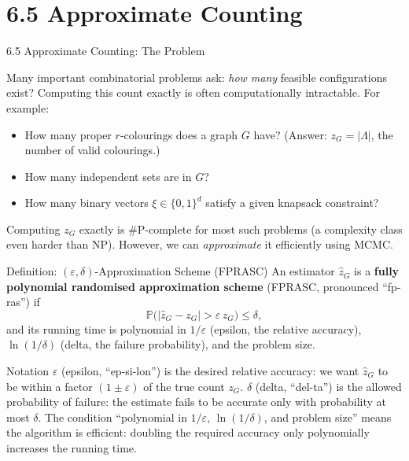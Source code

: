 \documentclass[aspectratio=169,10pt]{beamer}
\newcommand{\PP}{\mathbb{P}}
\begin{document}
\section{6.5 Approximate Counting}

\begin{frame}[allowframebreaks]{6.5 Approximate Counting: The Problem}

Many important combinatorial problems ask: \emph{how many} feasible configurations exist?
Computing this count exactly is often computationally intractable.
For example:
\begin{itemize}
  \item How many proper $r$-colourings does a graph $G$ have? (Answer: $z_G = |\Lambda|$, the number of valid colourings.)
  \item How many independent sets are in $G$?
  \item How many binary vectors $\xi \in \{0,1\}^d$ satisfy a given knapsack constraint?
\end{itemize}

Computing $z_G$ exactly is \#P-complete for most such problems (a complexity class even harder than NP).
However, we can \emph{approximate} it efficiently using MCMC.

\begin{block}{Definition: $(\varepsilon, \delta)$-Approximation Scheme (FPRASC)}
An estimator $\hat{z}_G$ is a \textbf{fully polynomial randomised approximation scheme} (FPRASC, pronounced ``fp-ras'') if
\[
  \PP\bigl(|\hat{z}_G - z_G| > \varepsilon\, z_G\bigr) \le \delta,
\]
and its running time is polynomial in $1/\varepsilon$ (epsilon, the relative accuracy), $\ln(1/\delta)$ (delta, the failure probability), and the problem size.
\end{block}

\begin{block}{Notation}
$\varepsilon$ (epsilon, ``ep-si-lon'') is the desired relative accuracy: we want $\hat{z}_G$ to be within a factor $(1 \pm \varepsilon)$ of the true count $z_G$.
$\delta$ (delta, ``del-ta'') is the allowed probability of failure: the estimate fails to be accurate only with probability at most $\delta$.
The condition ``polynomial in $1/\varepsilon$, $\ln(1/\delta)$, and problem size'' means the algorithm is efficient: doubling the required accuracy only polynomially increases the running time.
\end{block}


\end{frame}
\end{document}
